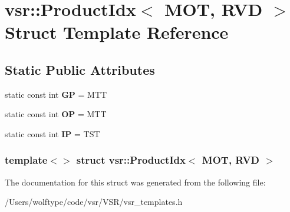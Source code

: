 \hypertarget{structvsr_1_1_product_idx_3_01_m_o_t_00_01_r_v_d_01_4}{\section{vsr\-:\-:Product\-Idx$<$ M\-O\-T, R\-V\-D $>$ Struct Template Reference}
\label{structvsr_1_1_product_idx_3_01_m_o_t_00_01_r_v_d_01_4}
}
\subsection*{Static Public Attributes}
\begin{DoxyCompactItemize}
\item 
\hypertarget{structvsr_1_1_product_idx_3_01_m_o_t_00_01_r_v_d_01_4_a8da3f46f63eb2ca3aafc4c562e7d1228}{static const int {\bfseries G\-P} = M\-T\-T}\label{structvsr_1_1_product_idx_3_01_m_o_t_00_01_r_v_d_01_4_a8da3f46f63eb2ca3aafc4c562e7d1228}

\item 
\hypertarget{structvsr_1_1_product_idx_3_01_m_o_t_00_01_r_v_d_01_4_ae7aa8d90ab8c17b95136b7e7db524256}{static const int {\bfseries O\-P} = M\-T\-T}\label{structvsr_1_1_product_idx_3_01_m_o_t_00_01_r_v_d_01_4_ae7aa8d90ab8c17b95136b7e7db524256}

\item 
\hypertarget{structvsr_1_1_product_idx_3_01_m_o_t_00_01_r_v_d_01_4_ab3ad4a4199b66016e3a2f21fd8aaf3bf}{static const int {\bfseries I\-P} = T\-S\-T}\label{structvsr_1_1_product_idx_3_01_m_o_t_00_01_r_v_d_01_4_ab3ad4a4199b66016e3a2f21fd8aaf3bf}

\end{DoxyCompactItemize}
\subsubsection*{template$<$$>$ struct vsr\-::\-Product\-Idx$<$ M\-O\-T, R\-V\-D $>$}



The documentation for this struct was generated from the following file\-:\begin{DoxyCompactItemize}
\item 
/\-Users/wolftype/code/vsr/\-V\-S\-R/vsr\-\_\-templates.\-h\end{DoxyCompactItemize}
